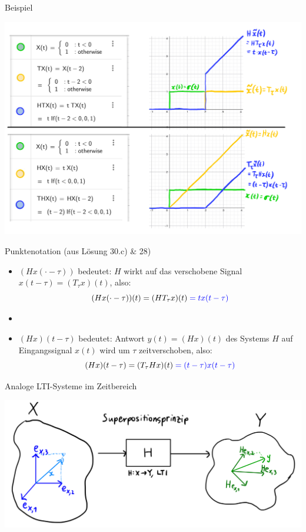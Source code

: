 \documentclass[14pt, aspectratio=169, handout]{beamer}
\begin{document}
\begin{frame}{Beispiel}
    \vspace*{-0.32cm}
    \begin{center}
        \includegraphics[width=0.8\linewidth]{figures/Zeitverschiebung_bsp.jpg}
    \end{center}
\end{frame}

\begin{frame}{Punktenotation (aus Lösung 30.c) \& 28)}
    \begin{itemize}
        \item $(Hx(\cdot -\tau))$ bedeutet: $H$ wirkt auf das verschobene Signal $x(t-\tau) = (T_\tau x)(t)$, also:
        $$(Hx(\cdot -\tau))(t) = (HT_\tau x)(t) \textcolor{blue}{\; = tx(t-\tau)}$$
        \item[]
        \item $(Hx)(t-\tau)$ bedeutet: Antwort $y(t) = (Hx)(t)$ des Systems $H$ auf Eingangssignal $x(t)$ wird um $\tau$ zeitverschoben, also:
        $$(Hx)(t-\tau) = (T_\tau Hx)(t) \textcolor{blue}{\; = (t-\tau)x(t-\tau)}$$
    \end{itemize}
\end{frame}

\begin{frame}{Analoge LTI-Systeme im Zeitbereich}
    \begin{center}
        \includegraphics[width=0.8\linewidth]{figures/Superposition.jpeg}
    \end{center}
\end{frame}
\end{document}
